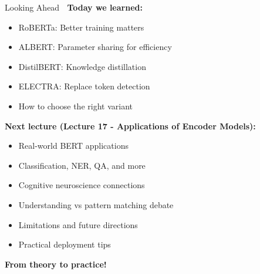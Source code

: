 \documentclass[aspectratio=169]{beamer}
\begin{document}
\begin{frame}[shrink=10]{Looking Ahead 🔮}
\textbf{Today we learned:}
\begin{itemize}\setlength{\itemsep}{0pt}
    \item RoBERTa: Better training matters
    \item ALBERT: Parameter sharing for efficiency
    \item DistilBERT: Knowledge distillation
    \item ELECTRA: Replace token detection
    \item How to choose the right variant
\end{itemize}

\vspace{1em}

\textbf{Next lecture (Lecture 17 - Applications of Encoder Models):}
\begin{itemize}\setlength{\itemsep}{0pt}
    \item \alert{Real-world BERT applications}
    \item \alert{Classification, NER, QA, and more}
    \item \alert{Cognitive neuroscience connections}
    \item \alert{Understanding vs pattern matching debate}
    \item \alert{Limitations and future directions}
    \item \alert{Practical deployment tips}
\end{itemize}

\vspace{1em}

\begin{center}
\Large
\textbf{From theory to practice! 🚀}
\end{center}
\end{frame}
\end{document}
